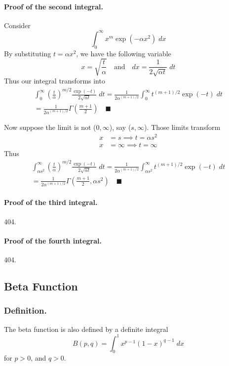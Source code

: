\documentclass[../../main.tex]{subfiles}
\begin{document}
\paragraph{Proof of the second integral.} Consider 
\begin{equation*}
    \int_{0}^{\infty}x^m \exp\left(-\alpha x^2\right)\; dx
\end{equation*}
By substituting $t=\alpha x^2$, we have the following variable
\begin{equation*}
    x=\sqrt{\frac{t}{\alpha}}\quad\text{and}\quad dx=\frac{1}{2\sqrt{\alpha t}}\;dt
\end{equation*}
Thus our integral transforms into 
\begin{multline*}
    \int_{0}^{\infty}\left(\frac{t}{\alpha}\right)^{m/2} \frac{\exp (-t)}{2\sqrt{\alpha t}}\; dt=\frac{1}{2\alpha^{(m+1)/2}} \int_{0}^{\infty} t^{(m+1)/2}\exp(-t)\;dt \\
    =\frac{1}{2\alpha^{(m+1)/2} }\Gamma\left(\frac{m+1}{2}\right)\quad \blacksquare
\end{multline*}

Now suppose the limit is not ($0,\infty$), say  ($s,\infty$). Those limits transform
\begin{align*}
    x&=s\implies t=\alpha s^2\\
    x&=\infty\implies t=\infty
\end{align*}
Thus
\begin{multline*}
    \int_{\alpha s^2}^{\infty}\left(\frac{t}{\alpha}\right)^{m/2} \frac{\exp (-t)}{2\sqrt{\alpha t}}\; dt=\frac{1}{2\alpha^{(m+1)/2}} \int_{\alpha s^2}^{\infty} t^{(m+1)/2}\exp(-t)\;dt \\
    =\frac{1}{2\alpha^{(m+1)/2} } \Gamma\left(\frac{m+1}{2}, \alpha s^2\right)\quad \blacksquare
\end{multline*}

\paragraph{Proof of the third integral.} 404.
\paragraph{Proof of the fourth integral.} 404. 


\subsection*{Beta Function}
\subsubsection*{Definition.} The beta function is also defined by a definite integral
\begin{equation*}
    B(p,q)=\int_{0}^{1}x^{p-1} (1-x)^{q-1}\;dx 
\end{equation*}
for $p > 0$, and $q > 0$. 
\end{document}
